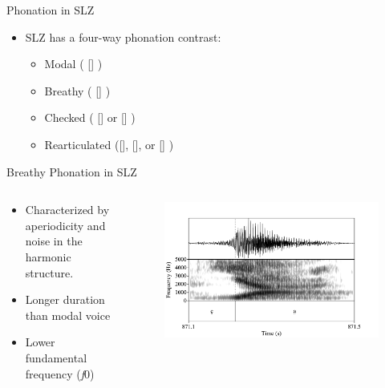 \documentclass[professionalfont]{beamer}
\begin{document}
\begin{frame}{Phonation in SLZ}
  \begin{itemize}
    \item SLZ has a four-way phonation contrast:
    \begin{itemize}
      \item Modal ( [] )
      \item Breathy ( [] )
      \item Checked ( [] or [] )
      \item Rearticulated ([], [], or [] )
    \end{itemize}
  \end{itemize}
\end{frame}

\begin{frame}{Breathy Phonation in SLZ}
  \begin{columns}
    \begin{column}{0.33\linewidth}
      \begin{itemize}
        \item Characterized by aperiodicity and noise in the harmonic structure.
        \item Longer duration than modal voice
        \item Lower fundamental frequency (\textit{f}0)
      \end{itemize}  
    \end{column}

    \begin{column}{0.67\linewidth}
      \begin{figure}[h!]
        \centering
        \includegraphics[width=\textwidth]{images/Spectrograms/yah.png}
      \end{figure}
    \end{column}
  \end{columns}
\end{frame}
\end{document}
